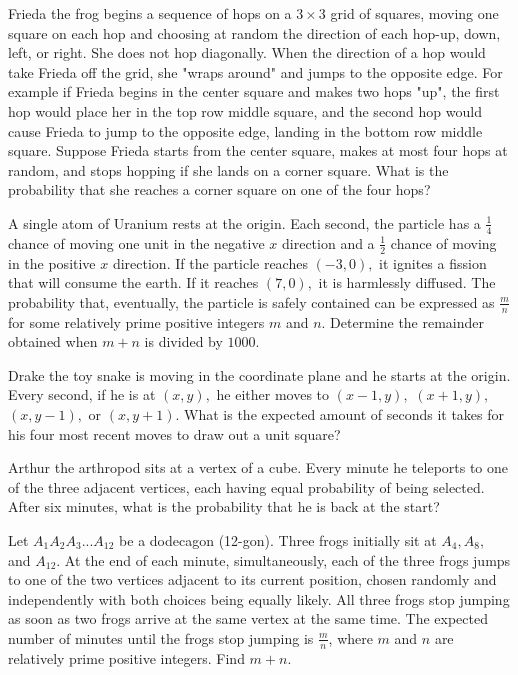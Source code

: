 \documentclass{article}
\begin{document}
\begin{prob}[AMC 10A 2020/23]{4}
Frieda the frog begins a sequence of hops on a $3 \times 3$ grid of squares, moving one square on each hop and choosing at random the direction of each hop-up, down, left, or right. She does not hop diagonally. When the direction of a hop would take Frieda off the grid, she "wraps around" and jumps to the opposite edge. For example if Frieda begins in the center square and makes two hops "up", the first hop would place her in the top row middle square, and the second hop would cause Frieda to jump to the opposite edge, landing in the bottom row middle square. Suppose Frieda starts from the center square, makes at most four hops at random, and stops hopping if she lands on a corner square. What is the probability that she reaches a corner square on one of the four hops?
\end{prob}

\begin{prob}[Mildorf]{4}
 A single atom of Uranium rests at the origin. Each second, the particle has a $\frac{1}{4}$ chance of moving one unit in the negative $x$ direction and a $\frac{1}{2}$ chance of moving in the positive $x$ direction. If the particle reaches $(-3,0),$ it ignites a fission that will consume the earth. If it reaches $(7,0),$ it is harmlessly diffused. The probability that, eventually, the particle is safely contained can be expressed as $\frac{m}{n}$ for some relatively prime positive integers $m$ and $n.$ Determine the remainder obtained when $m+n$ is divided by $1000.$
\end{prob}

\begin{prob}[AVHS 2017]{6}
 Drake the toy snake is moving in the coordinate plane and he starts at the origin. Every second, if he is at $(x,y),$ he either moves to $(x-1,y),$ $(x+1,y),$ $(x,y-1),$ or $(x,y+1).$ What is the expected amount of seconds it takes for his four most recent moves to draw out a unit square?
\end{prob}

\begin{prob}[]{6}
Arthur the arthropod sits at a vertex of a cube.  Every minute he teleports to one of the three adjacent vertices, each having equal probability of being selected.  After six minutes, what is the probability that he is back at the start?
\end{prob}

\begin{prob}[AIME I 2021/12]{6}
Let $A_1A_2A_3...A_{12}$ be a dodecagon (12-gon). Three frogs initially sit at $A_4,A_8,$ and $A_{12}$. At the end of each minute, simultaneously, each of the three frogs jumps to one of the two vertices adjacent to its current position, chosen randomly and independently with both choices being equally likely. All three frogs stop jumping as soon as two frogs arrive at the same vertex at the same time. The expected number of minutes until the frogs stop jumping is $\frac mn$, where $m$ and $n$ are relatively prime positive integers. Find $m+n$.
\end{prob}
\end{document}
